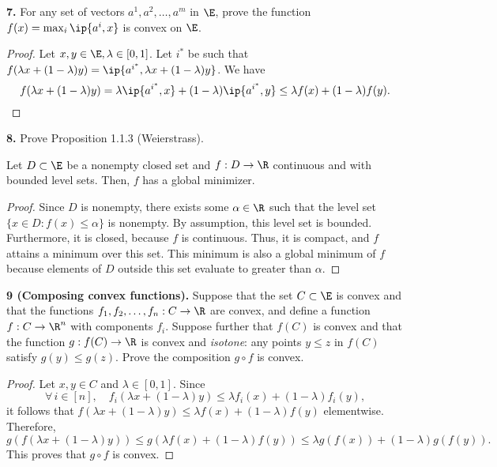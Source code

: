 \documentclass[12pt, letterpaper]{article}
\numberwithin{equation}{subsection}
\begin{document}
\textbf{7. } For any set of vectors $a^1,a^2,\ldots,a^m$ in $\E$, prove
the function $f(x) = \max_i \ip{a^i, x}$ is convex on $\E$.
\begin{proof}
Let $x,y\in\E, \lambda\in[0,1]$. Let $i^*$ be such that 
$f(\lambda x+(1-\lambda)y) = \ip{a^{i^*}, \lambda x + (1-\lambda)y}$. 
We have 
\begin{equation*}
f(\lambda x +(1-\lambda)y) = \lambda\ip{a^{i^*}, x} + (1-\lambda)\ip{
a^{i^*}, y} \leq \lambda f(x) + (1-\lambda)f(y).
\end{equation*}
\end{proof}\noindent
\textbf{8.} Prove Proposition 1.1.3 (Weierstrass). 
\begin{proposition}[Weierstrass]
Let $D\subset\E$ be a nonempty closed set and $f:D\to\R$ continuous 
and with bounded level sets. Then, $f$ has a global minimizer.
\end{proposition}
\begin{proof}
Since $D$ is nonempty, there exists some $\alpha\in\R$ such that 
the level set $\{x\in D : f(x)\leq\alpha\}$ is nonempty. By 
assumption, this level set is bounded. Furthermore, it is closed,
because $f$ is continuous. Thus, it is compact, and $f$ attains a 
minimum over this set. This minimum is also a global minimum of $f$ 
because elements of $D$ outside this set evaluate to greater than $\alpha$.
\end{proof}
\noindent
\textbf{9 (Composing convex functions).} Suppose that the set $C\subset\E$
is convex and that the functions $f_1,f_2,\ldots, f_n:C\to\R$ are 
convex, and define a function $f:C\to\R^n$ with components $f_i$. 
Suppose further that $f(C)$ is convex and that the function $g:
f(C)\to\R$ is convex and \textit{isotone}: any points $y\leq z$ in 
$f(C)$ satisfy $g(y)\leq g(z)$. Prove the composition 
$g\circ f$ is convex.
\begin{proof}
Let $x,y\in C$ and $\lambda\in[0,1]$. Since 
\begin{equation*}
\forall\,i\in[n],\quad
f_i(\lambda x + (1-\lambda)y)\leq \lambda f_i(x)+(1-\lambda)f_i(y),
\end{equation*}
it follows that $f(\lambda x+(1-\lambda)y)\leq \lambda f(x)
+(1-\lambda)f(y)$ elementwise. Therefore,
\begin{equation*}
g(f(\lambda x + (1-\lambda)y)) \leq g(\lambda f(x)+(1-\lambda)f(y))
\leq \lambda g(f(x)) + (1-\lambda)g(f(y)).
\end{equation*}
This proves that $g\circ f$ is convex.
\end{proof}\noindent
\end{document}
